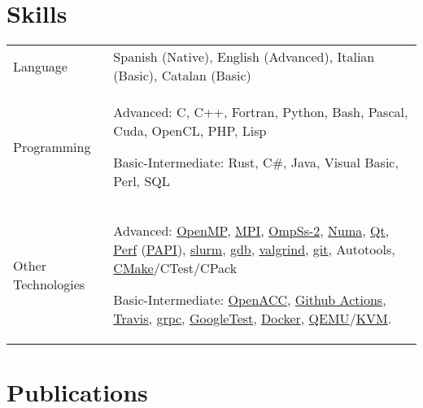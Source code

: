 \documentclass[a4paper,10pt]{article}
\begin{document}
\section{Skills}
\begin{tabularx}{\linewidth}{@{}l X@{}}
  Language & Spanish (Native), English (Advanced), Italian (Basic), Catalan (Basic)\\
  Programming & Advanced: C, C++, Fortran, Python, Bash,
                Pascal, Cuda, OpenCL, PHP, Lisp

                Basic-Intermediate: Rust, C\#, Java, Visual Basic, Perl, SQL  \\

  Other Technologies & Advanced: \href{https://www.openmp.org/}{OpenMP},
                       \href{https://www.mpi-forum.org/}{MPI},
                       \href{https://pm.bsc.es/ompss-2}{OmpSs-2},
                       \href{https://www.kernel.org/doc/html/v4.19/vm/numa.html}{Numa},
                       \href{https://www.qt.io/}{Qt}, \href{https://perf.wiki.kernel.org/index.php/Main_Page}{Perf}
                       (\href{https://icl.utk.edu/papi/}{PAPI}),
                       \href{https://slurm.schedmd.com/}{slurm},
                       \href{https://www.sourceware.org/gdb/}{gdb},
                       \href{https://valgrind.org/}{valgrind},
                       \href{https://git-scm.com/}{git}, Autotools, \href{https://cmake.org/}{CMake}/CTest/CPack

                       Basic-Intermediate: \href{https://www.openacc.org/}{OpenACC},
                       \href{https://github.com/features/actions}{Github Actions},
                       \href{https://www.travis-ci.com/}{Travis},
                       \href{https://grpc.io/}{grpc},
                       \href{https://google.github.io/googletest/}{GoogleTest},
                       \href{https://www.docker.com/}{Docker}, \href{https://www.qemu.org/}{QEMU}/\href{https://www.linux-kvm.org/page/Main_Page}{KVM}. \\
\end{tabularx}

\section{Publications}
\begin{refsection}
    \nocite{*}
    \printbibliography[heading=none]
\end{refsection}


\vfill
{}
\end{document}
